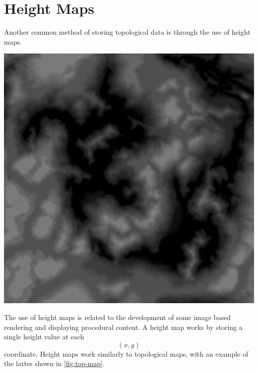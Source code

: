 \documentclass[10pt]{report}
\begin{document}
		\section{Height Maps}
			
			Another common method of storing topological data is through the use of height maps. 
			
			\begin{minipage}{\textwidth}
				\centering
				\includegraphics[scale=.4]{D10}
				\label{fig:height-map}
			\end{minipage}
			
			The use of height maps is related to the development of some image based rendering and displaying procedural content. A height map works by storing a single height value at each \[(x,y)\] coordinate. Height maps work similarly to topological maps, with an example of the latter shown in \autoref{fig:top-map}.
			
\end{document}

